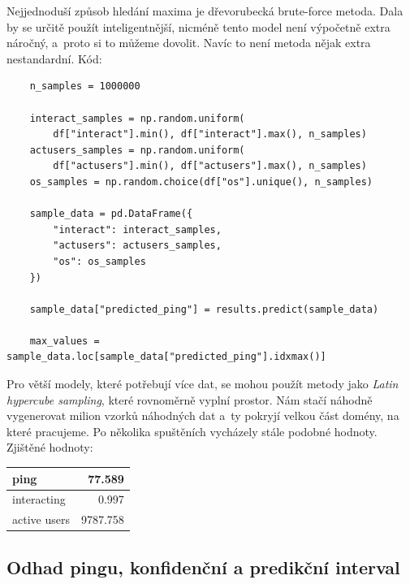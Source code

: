 \documentclass[a4paper, 11pt]{article}
\begin{document}
Nejjednoduší způsob hledání maxima je dřevorubecká brute-force metoda.
Dala by se určitě použít inteligentnější, nicméně tento model není výpočetně extra náročný, a~proto si to můžeme dovolit.
Navíc to není metoda nějak extra nestandardní.
Kód:
\begin{verbatim}
    n_samples = 1000000

    interact_samples = np.random.uniform(
        df["interact"].min(), df["interact"].max(), n_samples)
    actusers_samples = np.random.uniform(
        df["actusers"].min(), df["actusers"].max(), n_samples)
    os_samples = np.random.choice(df["os"].unique(), n_samples)

    sample_data = pd.DataFrame({
        "interact": interact_samples,
        "actusers": actusers_samples,
        "os": os_samples
    })

    sample_data["predicted_ping"] = results.predict(sample_data)

    max_values = sample_data.loc[sample_data["predicted_ping"].idxmax()]
\end{verbatim}
Pro větší modely, které potřebují více dat, se mohou použít metody jako \emph{Latin hypercube sampling}, které rovnoměrně vyplní prostor.
Nám stačí náhodně vygenerovat milion vzorků náhodných dat a~ty pokryjí velkou část domény, na které pracujeme.
Po několika spuštěních vycházely stále podobné hodnoty.
Zjištěné hodnoty:
\begin{table}[h!]
    \centering
    \begin{tabularx}{0.4\textwidth}{|X|R|}
        \hline
        ping & 77.589 \\
        \hline
        interacting & 0.997 \\
        \hline
        active users & 9787.758 \\
        \hline
    \end{tabularx}
\end{table}

\subsection{Odhad pingu, konfidenční a predikční interval}
\end{document}
